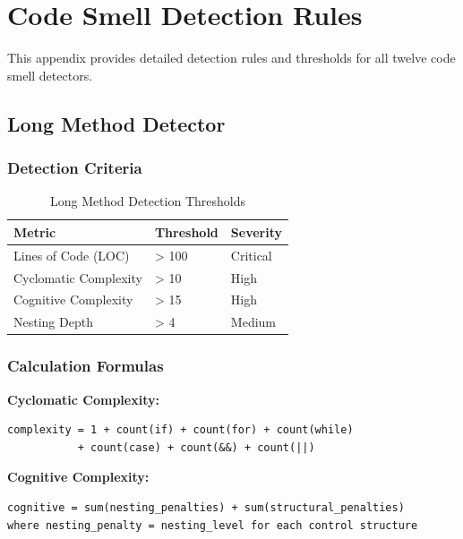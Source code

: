 \documentclass[12pt,a4paper]{article}
\begin{document}
    \section{Code Smell Detection Rules}

    This appendix provides detailed detection rules and thresholds for all twelve code smell detectors.

    \subsection{Long Method Detector}

    \subsubsection{Detection Criteria}

    \begin{table}[H]
        \caption{Long Method Detection Thresholds}
        \begin{tabular}{|l|l|l|}
            \hline
            \textbf{Metric} & \textbf{Threshold} & \textbf{Severity} \\
            \hline
            Lines of Code (LOC) & > 100 & Critical \\
            \hline
            Cyclomatic Complexity & > 10 & High \\
            \hline
            Cognitive Complexity & > 15 & High \\
            \hline
            Nesting Depth & > 4 & Medium \\
            \hline
        \end{tabular}
    \end{table}

    \subsubsection{Calculation Formulas}

    \textbf{Cyclomatic Complexity:}
    \begin{verbatim}
complexity = 1 + count(if) + count(for) + count(while)
           + count(case) + count(&&) + count(||)
    \end{verbatim}

    \textbf{Cognitive Complexity:}
    \begin{verbatim}
cognitive = sum(nesting_penalties) + sum(structural_penalties)
where nesting_penalty = nesting_level for each control structure
    \end{verbatim}
\end{document}
